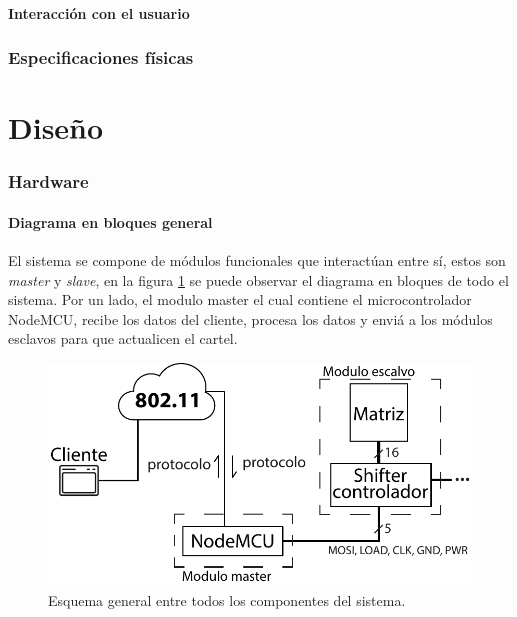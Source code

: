 \subsection{Interacción con el usuario}
\section{Especificaciones físicas}



\clearpage
\part{Diseño}\label{part:diseno}
\section{Hardware}\label{sec:hw}
\subsection{Diagrama en bloques general}
El sistema se compone de módulos funcionales que interactúan entre sí, estos son \emph{master} y \emph{slave}, en la figura \ref{fig:diagrama-bloques-general} se puede observar el diagrama en bloques de todo el sistema. Por un lado, el modulo master el cual contiene el microcontrolador NodeMCU, recibe los datos del cliente, procesa los datos y enviá a los módulos esclavos para que actualicen el cartel.

\begin{figure}[!ht]
	\centering
	\includegraphics[width=\linewidth]{imagenes/hw/diagrama-bloques-general.pdf}
	\caption{Esquema general entre todos los componentes del sistema.}
	\label{fig:diagrama-bloques-general}
\end{figure}

